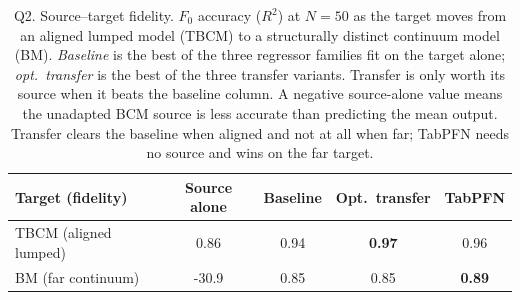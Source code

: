 \begin{table}[htbp]
\centering
\small
\caption{Q2. Source--target fidelity. $F_0$ accuracy ($R^2$) at $N=50$ as the target moves from an aligned lumped model (TBCM) to a structurally distinct continuum model (BM). \emph{Baseline} is the best of the three regressor families fit on the target alone; \emph{opt.\ transfer} is the best of the three transfer variants. Transfer is only worth its source when it beats the baseline column. A negative source-alone value means the unadapted BCM source is less accurate than predicting the mean output. Transfer clears the baseline when aligned and not at all when far; TabPFN needs no source and wins on the far target.}
\label{tab:q2}
\begin{tabular}{lcccc}
\toprule
Target (fidelity) & Source alone & Baseline & Opt.\ transfer & TabPFN \\
\midrule
TBCM (aligned lumped) & 0.86 & 0.94 & \textbf{0.97} & 0.96 \\
BM (far continuum) & -30.9 & 0.85 & 0.85 & \textbf{0.89} \\
\bottomrule
\end{tabular}
\end{table}

